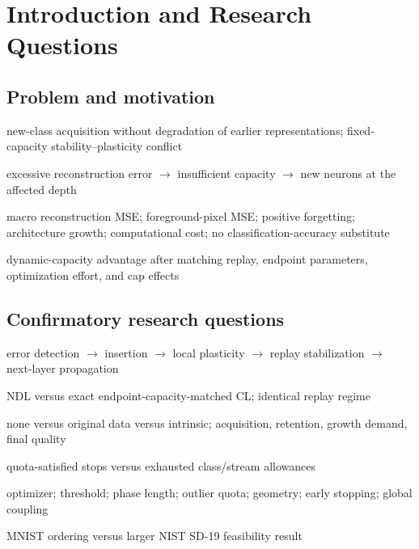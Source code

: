 \section{Introduction and Research Questions}

\subsection{Problem and motivation}
\begin{draftpoints}
  \item {}new-class acquisition without degradation of earlier representations; fixed-capacity stability--plasticity conflict
  \item {}excessive reconstruction error $\rightarrow$ insufficient capacity $\rightarrow$ new neurons at the affected depth \parencite{draelos2017neurogenesis}
  \item {}macro reconstruction MSE; foreground-pixel MSE; positive forgetting; architecture growth; computational cost; no classification-accuracy substitute
  \item {}dynamic-capacity advantage after matching replay, endpoint parameters, optimization effort, and cap effects
\end{draftpoints}

\subsection{Confirmatory research questions}
\begin{draftpoints}
  \item {}error detection $\rightarrow$ insertion $\rightarrow$ local plasticity $\rightarrow$ replay stabilization $\rightarrow$ next-layer propagation \parencite{draelos2017neurogenesis}
  \item {}NDL versus exact endpoint-capacity-matched CL; identical replay regime
  \item {}none versus original data versus intrinsic; acquisition, retention, growth demand, final quality
  \item {}quota-satisfied stops versus exhausted class/stream allowances
  \item {}optimizer; threshold; phase length; outlier quota; geometry; early stopping; global coupling
  \item {}MNIST ordering versus larger NIST SD-19 feasibility result
\end{draftpoints}


